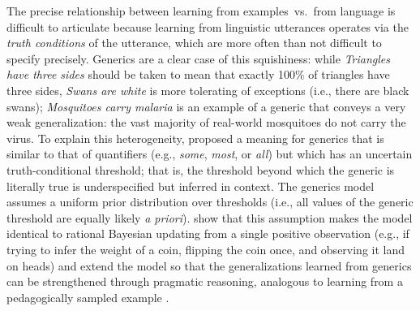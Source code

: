 \documentclass[10pt,letterpaper]{article}
\newcommand{\mht}[1]{\textcolor{Blue}{[mht: #1]}}
\begin{document}
The precise relationship between learning from examples~vs.~from language is difficult to articulate because learning from linguistic utterances operates via the \emph{truth conditions} of the utterance, which are more often than not difficult to specify precisely. %
Generics are a clear case of this squishiness:  while \emph{Triangles have three sides} should be taken to mean that exactly 100\% of triangles have three sides, \emph{Swans are white} is more tolerating of exceptions (i.e., there are black swans); \emph{Mosquitoes carry malaria} is an example of a generic that conveys a very weak generalization: the vast majority of real-world mosquitoes do not carry the virus. 
To explain this heterogeneity,  proposed a meaning for generics that is similar to that of quantifiers (e.g., \emph{some}, \emph{most}, or \emph{all}) but which has an uncertain truth-conditional threshold; that is, the threshold beyond which the generic is literally true is underspecified but inferred in context.
The generics model assumes a uniform prior distribution over thresholds (i.e., all values of the generic threshold are equally likely \emph{a priori}).
 show that this assumption makes the model identical to rational Bayesian updating from a single positive observation (e.g., if trying to infer the weight of a coin, flipping the coin once, and observing it land on heads) and extend the model so that the generalizations learned from generics can be strengthened through pragmatic reasoning, analogous to learning from a pedagogically sampled example \cite{shafto2012learning}. 

%
\end{document}
